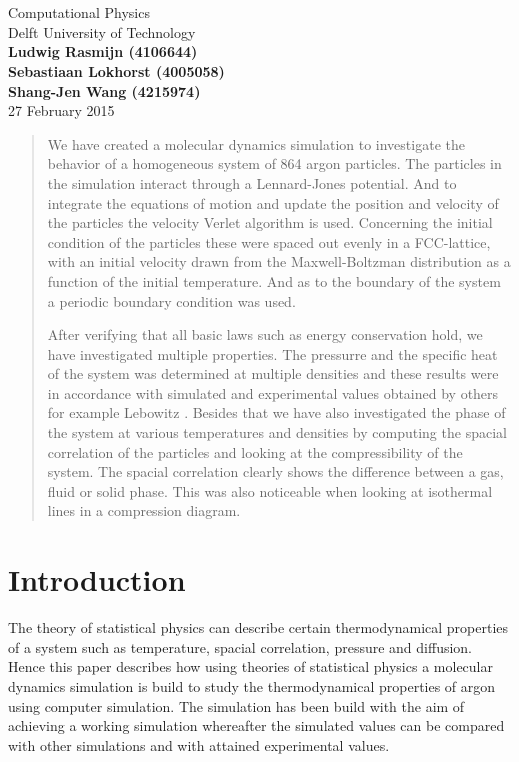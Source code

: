\documentclass[12pt,a4paper]{report}
\newcommand*{\titleBC}{
	\begingroup
	\centering

	\def\CP{\textit{\Large Simulating argon}}

	\settowidth{\unitlength}{\CP} %
	{\color{CadetBlue}\resizebox*{\unitlength}{\baselineskip}{\rotatebox{90}{$\}$}}} \\[\baselineskip] %
	{\color{Black}{\CP}} \\[\baselineskip] %
	{\color{Black}\large Computational Physics} \\
	{\color{Grey}\large Delft University of Technology} \\
	{\color{CadetBlue}\resizebox*{\unitlength}{\baselineskip}{\rotatebox{-90}{$\}$}}} %
	\vfill
	\large{\textbf{Ludwig Rasmijn (4106644)}}\\
	\large{\textbf{Sebastiaan Lokhorst (4005058)}}\\
	\large{\textbf{Shang-Jen Wang (4215974)}}\\
	\vfill
	\pagestyle{empty}
	27 February 2015

	\endgroup
}
\begin{document}
\pagestyle{empty}
\titleBC

\newpage

\begin{abstract}
We have created a molecular dynamics simulation to investigate the behavior of a homogeneous system of 864 argon particles. The particles in the simulation interact through a Lennard-Jones potential. And to integrate the equations of motion and update the position and velocity of the particles the velocity Verlet algorithm is used. Concerning the initial condition of the particles these were spaced out evenly in a FCC-lattice, with an initial velocity drawn from the Maxwell-Boltzman distribution as a function of the initial temperature. And as to the boundary of the system a periodic boundary condition was used.

After verifying that all basic laws such as energy conservation hold, we have investigated multiple properties. The pressurre and the specific heat of the system was determined at multiple densities and these results were in accordance with simulated and experimental values obtained by others for example Lebowitz \cite{lebowitz1967}. Besides that we have also investigated the phase of the system at various temperatures and densities by computing the spacial correlation of the particles and looking at the compressibility of the system. The spacial correlation clearly shows the difference between a gas, fluid or solid phase. This was also noticeable when looking at isothermal lines in a compression diagram.
\end{abstract}

\newpage

\tableofcontents

\newpage

\pagestyle{fancy}
\fancyhead{}
\fancyfoot{}
\renewcommand{\headrulewidth}{0pt}
\fancyfoot[C]{\thepage}

\chapter{Introduction}

The theory of statistical physics can describe certain thermodynamical properties of a system such as temperature, spacial correlation, pressure and diffusion. Hence this paper describes how using theories of statistical physics a molecular dynamics simulation is build to study the thermodynamical properties of argon using computer simulation. The simulation has been build with the aim of achieving a working simulation whereafter the simulated values can be compared with other simulations and with attained experimental values.
\end{document}

